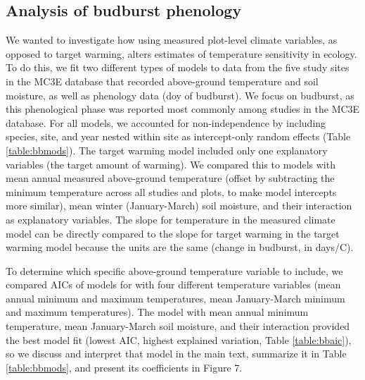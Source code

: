 \documentclass{article}
\begin{document}
\subsection* {Analysis of budburst phenology}
We wanted to investigate how using measured plot-level climate variables, as opposed to target warming, alters estimates of temperature sensitivity in ecology. To do this, we fit two different types of models to data from the five study sites in the MC3E database that recorded above-ground temperature and soil moisture, as well as phenology data (doy of budburst). We focus on budburst, as this phenological phase was reported most commonly among studies in the MC3E database. For all models, we accounted for non-independence by including species, site, and year nested within site as intercept-only random effects (Table \ref{table:bbmods}). The target warming model included only one explanatory variables (the target amount of warming).  We compared this to models with mean annual measured above-ground temperature (offset by subtracting the minimum temperature across all studies and plots, to make model intercepts more similar), mean winter (January-March) soil moisture, and their interaction as explanatory variables. The slope for temperature in the measured climate model can be directly compared to the slope for target warming in the target warming model because the units are the same (change in budburst, in days/\degree C).
\par To determine which specific above-ground temperature variable to include, we compared AICs of models for with four different temperature variables (mean annual minimum and maximum temperatures, mean January-March minimum and maximum temperatures). The model with mean annual minimum temperature, mean January-March soil moisture, and their interaction provided the best model fit (lowest AIC, highest explained variation, Table \ref{table:bbaic}), so we discuss and interpret that model in the main text, summarize it in Table \ref{table:bbmods}, and present its coefficients in Figure 7. 

\clearpage
\end{document}
